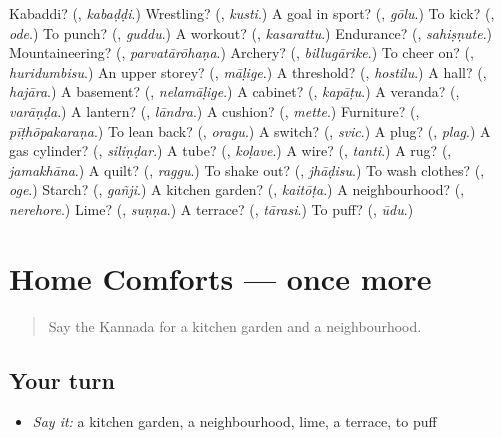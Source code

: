 \begin{tcolorbox}[breakable,colback=teal!4,colframe=teal!35!black,title={Before you move on}]
Kabaddi? (\textbf{}, \emph{kabaḍḍi}.) Wrestling? (\textbf{}, \emph{kusti}.) A goal in sport? (\textbf{}, \emph{gōlu}.) To kick? (\textbf{}, \emph{ode}.) To punch? (\textbf{}, \emph{guddu}.) A workout? (\textbf{}, \emph{kasarattu}.) Endurance? (\textbf{}, \emph{sahiṣṇute}.) Mountaineering? (\textbf{}, \emph{parvatārōhaṇa}.) Archery? (\textbf{}, \emph{billugārike}.) To cheer on? (\textbf{}, \emph{huridumbisu}.) An upper storey? (\textbf{}, \emph{māḷige}.) A threshold? (\textbf{}, \emph{hostilu}.) A hall? (\textbf{}, \emph{hajāra}.) A basement? (\textbf{}, \emph{nelamāḷige}.) A cabinet? (\textbf{}, \emph{kapāṭu}.) A veranda? (\textbf{}, \emph{varāṇḍa}.) A lantern? (\textbf{}, \emph{lāndra}.) A cushion? (\textbf{}, \emph{mette}.) Furniture? (\textbf{}, \emph{pīṭhōpakaraṇa}.) To lean back? (\textbf{}, \emph{oragu}.) A switch? (\textbf{}, \emph{svic}.) A plug? (\textbf{}, \emph{plag}.) A gas cylinder? (\textbf{}, \emph{siliṇḍar}.) A tube? (\textbf{}, \emph{koḷave}.) A wire? (\textbf{}, \emph{tanti}.) A rug? (\textbf{}, \emph{jamakhāna}.) A quilt? (\textbf{}, \emph{raggu}.) To shake out? (\textbf{}, \emph{jhāḍisu}.) To wash clothes? (\textbf{}, \emph{oge}.) Starch? (\textbf{}, \emph{gañji}.) A kitchen garden? (\textbf{}, \emph{kaitōṭa}.) A neighbourhood? (\textbf{}, \emph{nerehore}.) Lime? (\textbf{}, \emph{suṇṇa}.) A terrace? (\textbf{}, \emph{tārasi}.) To puff? (\textbf{}, \emph{ūdu}.)
\end{tcolorbox}
\section[(dialogue)]{Home Comforts — once more}

\label{lesson:KA-R546-review-final-546}



\begin{quote}
Say the Kannada for a kitchen garden and a neighbourhood.
\end{quote}

\subsection*{Your turn}
\begin{itemize}
\raggedright
  \item \emph{Say it:} a kitchen garden, a neighbourhood, lime, a terrace, to puff
\end{itemize}

